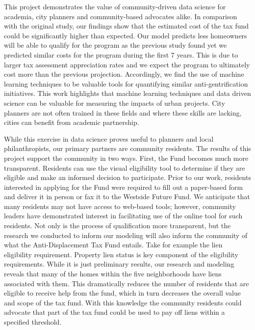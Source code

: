 \documentclass{acm_proc_article-sp}
\begin{document}
This project demonstrates the value of community-driven data science for academia, city planners and community-based advocates alike. In comparison with the original study, our findings show that the estimated cost of the tax fund could be significantly higher than expected. Our model predicts less homeowners will be able to qualify for the program as the previous study found yet we predicted similar costs for the program during the first 7 years. This is due to larger tax assessment appreciation rates and we expect the program to ultimately cost more than the previous projection. Accordingly, we find the use of machine learning techniques to be valuable tools for quantifying similar anti-gentrification initiatives.  This work highlights that machine learning techniques and data driven science can be valuable for measuring the impacts of urban projects. City planners are not often trained in these fields and where these skills are lacking, cities can benefit from academic partnership.

While this exercise in data science proves useful to planners and local philanthropists, our primary partners are community residents. The results of this project support the community in two ways. First, the Fund becomes much more transparent. Residents can use the visual eligibility tool to determine if they are eligible and make an informed decision to participate. Prior to our work, residents interested in applying for the Fund were required to fill out a paper-based form and deliver it in person or fax it to the Westside Future Fund. We anticipate that many residents may not have access to web-based tools; however, community leaders have demonstrated interest in facilitating use of the online tool for such residents. Not only is the process of qualification more transparent, but the research we conducted to inform our modeling will also inform the community of what the Anti-Displacement Tax Fund entails. Take for example the lien eligibility requirement. Property lien status is key component of the eligibility requirements. While it is just preliminary results, our research and modeling reveals that many of the homes within the five neighborhoods have liens associated with them. This dramatically reduces the number of residents that are eligible to receive help from the fund, which in turn decreases the overall value and scope of the tax fund. With this knowledge the community residents could advocate that part of the tax fund could be used to pay off liens within a specified threshold.
\end{document}
